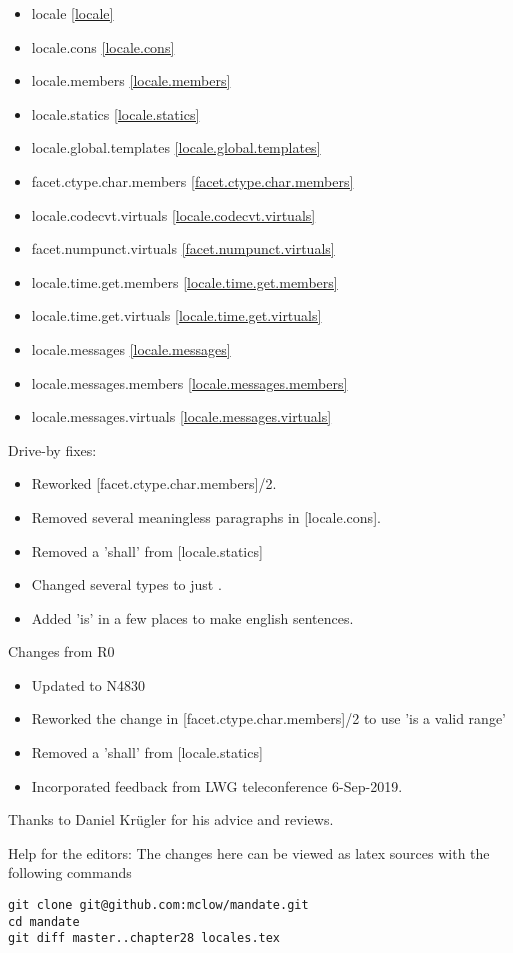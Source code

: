 \begin{multicols}{2}
\begin{itemize}
\item{locale}						\ref{locale}
\item{locale.cons}					\ref{locale.cons}
\item{locale.members}				\ref{locale.members}
\item{locale.statics}				\ref{locale.statics}
\item{locale.global.templates}		\ref{locale.global.templates}
\item{facet.ctype.char.members}		\ref{facet.ctype.char.members}
\item{locale.codecvt.virtuals}		\ref{locale.codecvt.virtuals}
\item{facet.numpunct.virtuals}		\ref{facet.numpunct.virtuals}
\item{locale.time.get.members}		\ref{locale.time.get.members}
\item{locale.time.get.virtuals}		\ref{locale.time.get.virtuals}
\item{locale.messages}				\ref{locale.messages}
\item{locale.messages.members}		\ref{locale.messages.members}
\item{locale.messages.virtuals}		\ref{locale.messages.virtuals}
\end{itemize}
\end{multicols}

Drive-by fixes:
\begin{itemize}
\item{Reworked [facet.ctype.char.members]/2.}
\item{Removed several meaningless paragraphs in [locale.cons].}
\item{Removed a 'shall' from [locale.statics]}
\item{Changed several  types to just .}
\item{Added 'is' in a few places to make english sentences.}
\end{itemize}

Changes from R0
\begin{itemize}
\item{Updated to N4830}
\item{Reworked the change in [facet.ctype.char.members]/2 to use 'is a valid range'}
\item{Removed a 'shall' from [locale.statics]}
\item{Incorporated feedback from LWG teleconference 6-Sep-2019.}
\end{itemize}



Thanks to Daniel Krügler for his advice and reviews.

\vfill
Help for the editors: The changes here can be viewed as latex sources with the following commands
\begin{verbatim}
git clone git@github.com:mclow/mandate.git
cd mandate
git diff master..chapter28 locales.tex
\end{verbatim}

